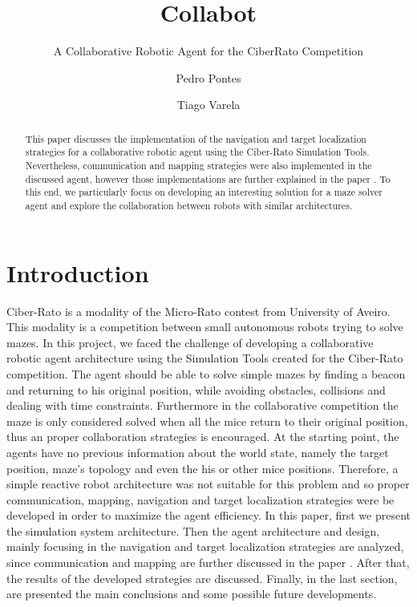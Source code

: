 \documentclass[oribibl]{llncs}
\title{Collabot}
\subtitle{A Collaborative Robotic Agent for the CiberRato Competition  }
\author{Pedro Pontes \and Tiago Varela}
\institute{Faculdade de Engenharia da Universidade do Porto}
\begin{document}
\maketitle
\begin{abstract}
This paper discusses the implementation of the navigation and target localization strategies for a  collaborative robotic agent using the Ciber-Rato Simulation Tools. Nevertheless, communication and mapping strategies were also implemented in the discussed agent, however those implementations are further explained in the paper \cite{baboehelder}.
To this end, we particularly focus on developing an interesting solution for a maze solver agent and explore the collaboration between robots with similar architectures.
\end{abstract}

\section{Introduction}
Ciber-Rato is a modality of the Micro-Rato contest from University of Aveiro. This modality is a competition between small autonomous robots trying to solve mazes. \cite{Lau2002} 
In this project, we faced the challenge of developing a collaborative robotic agent architecture using the Simulation Tools created for the Ciber-Rato competition. The agent should be able to solve simple mazes by finding a beacon and returning to his original position, while avoiding obstacles, collisions and dealing with time constraints. Furthermore in the collaborative competition the maze is only considered solved when all the mice return to their original position, thus an proper collaboration strategies is encouraged.
At the starting point, the agents have no previous information about the world state, namely the target position, maze's topology and even the his or other mice positions. Therefore, a simple reactive robot architecture was not suitable for this problem and so proper communication, mapping, navigation and target localization strategies were be developed in order to maximize the agent efficiency.
In this paper, first we present the simulation system architecture. Then the agent architecture and design, mainly focusing in the navigation and target localization strategies are analyzed, since communication and mapping are further discussed in the paper \cite{baboehelder}. After that, the results of the developed strategies are discussed. Finally, in the last section, are presented the main conclusions and some possible future developments.
\end{document}
